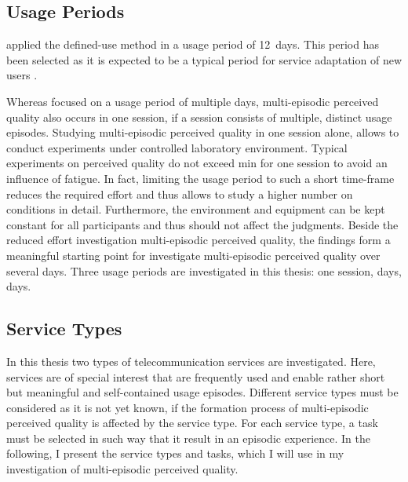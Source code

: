 \subsection{Usage Periods}
\citet{moller_single-call_2011} applied the defined-use method in a usage period of 12~days. 
This period has been selected as it is expected to be a typical period for service adaptation of new users \citep[\cf,][]{moller_single-call_2011}.

Whereas \citet{moller_single-call_2011} focused on a usage period of multiple days, multi-episodic perceived quality also occurs in one session, if a session consists of multiple, distinct usage episodes.
Studying multi-episodic perceived quality in one session alone, allows to conduct experiments under controlled laboratory environment. %
Typical experiments on perceived quality do not exceed \unit[90]{min} for one session to avoid an influence of fatigue.
In fact, limiting the usage period to such a short time-frame reduces the required effort and thus allows to study a higher number on conditions in detail.
Furthermore, the environment and equipment can be kept constant for all participants and thus should not affect the judgments.
Beside the reduced effort investigation multi-episodic perceived quality, the findings form a meaningful starting point for investigate multi-episodic perceived quality over several days.
Three usage periods are investigated in this thesis: one session, \unit[6]{days}, \unit[14]{days}.

\subsection{Service Types}
In this thesis two types of telecommunication services are investigated.
Here, services are of special interest that are frequently used and enable rather short but meaningful and self-contained usage episodes.
Different service types must be considered as it is not yet known, if the formation process of multi-episodic perceived quality is affected by the service type.
For each service type, a task must be selected in such way that it result in an episodic experience.
In the following, I present the service types and tasks, which I will use in my investigation of multi-episodic perceived quality.

